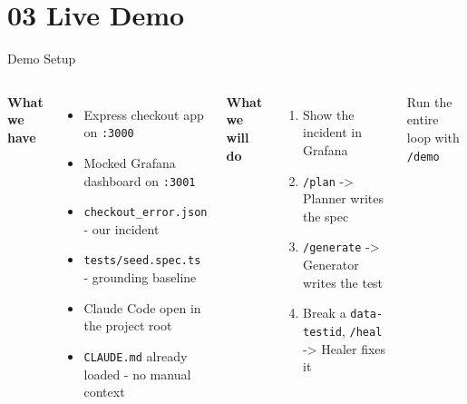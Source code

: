 \documentclass[aspectratio=169,10pt]{beamer}
\newcommand{\cmdbox}[1]{%
  \colorbox{docblue!10}{\texttt{\small\color{docblue}#1}}%
}
\begin{document}
\section{03 \quad Live Demo}

\begin{frame}{Demo Setup}
  \begin{columns}[T]
      \textbf{What we have}

      \vspace{0.5em}
      \begin{itemize}
        \setlength\itemsep{0.4em}
        \item Express checkout app on \texttt{:3000}
        \item Mocked Grafana dashboard on \texttt{:3001}
        \item \texttt{checkout\_error.json} - our incident
        \item \texttt{tests/seed.spec.ts} - grounding baseline
        \item Claude Code open in the project root
        \item \texttt{CLAUDE.md} already loaded - no manual context
      \end{itemize}

      \textbf{What we will do}

      \vspace{0.5em}
      \begin{enumerate}
        \setlength\itemsep{0.5em}
        \item Show the incident in Grafana
        \item \cmdbox{/plan} -> Planner writes the spec
        \item \cmdbox{/generate} -> Generator writes the test
        \item Break a \texttt{data-testid}, \cmdbox{/heal} -> Healer fixes it
      \end{enumerate}

      \vspace{0.8em}
      \begin{exampleblock}{}
        \small Run the entire loop with \cmdbox{/demo}
      \end{exampleblock}
  \end{columns}
\end{frame}
\end{document}
